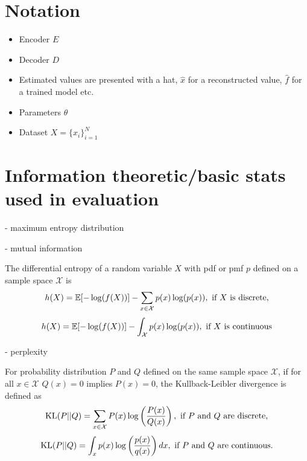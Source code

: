 \documentclass[../../thesis.tex]{subfiles}
\begin{document}

\section{Notation}

\begin{itemize}
    \item Encoder $E$
    \item Decoder $D$
    \item Estimated values are presented with a hat, $\widehat{x}$ for a reconstructed value, $\widehat{f}$ for a trained model etc.
    \item Parameters $\theta$ 
    \item Dataset $X = \{x_i\}_{i=1}^N$  
\end{itemize}

\section{Information theoretic/basic stats used in evaluation}

- maximum entropy distribution

- mutual information


\begin{definition}
    The differential entropy of a random variable $X$  with pdf or pmf $p$ defined on a sample space $\mathcal{X}$ is
    \begin{equation}
        h(X) =\mathbb{E}[-\log(f(X))] -\sum_{x\in \mathcal{X}} p(x)\log(p(x)),\text{ if $X$ is discrete,}
    \end{equation}
    \begin{equation}
        h(X) =\mathbb{E}[-\log(f(X))] -\int_{\mathcal{X}} p(x)\log(p(x)),\text{ if $X$ is continuous}
    \end{equation}
\end{definition}


- perplexity

\begin{definition}[KL-Divergence]
    For probability distribution $P$ and $Q$ defined on the same sample space $\mathcal{X}$, if for all $x\in\mathcal{X} $ $Q(x)=0$ implies $P(x)=0$, the Kullback-Leibler divergence is defined as
    \begin{equation}
        \operatorname*{\mathrm{KL}}(P||Q) = \sum_{x\in\mathcal{X}} P(x)\log\left(\frac{P(x)}{Q(x)}\right), \text{ if $P$ and $Q$ are discrete,}
    \end{equation}
    \begin{equation}
        \operatorname*{\mathrm{KL}}(P||Q) = \int_{x} p(x)\log\left(\frac{p(x)}{q(x)}\right)dx, \text{ if $P$ and $Q$ are continuous}.
    \end{equation}
\end{definition}
\end{document}
